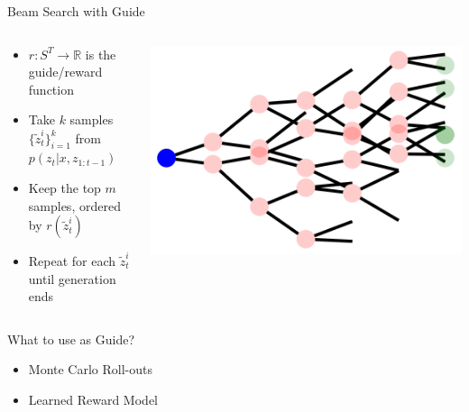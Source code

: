 \documentclass[14pt,aspectratio=169]{beamer}
\begin{document}
\begin{frame}{Beam Search with Guide}
	\begin{columns}
		\begin{column}{0.5\linewidth}
			\begin{itemize}
                \item $r: S^T \rightarrow \mathbb{R}$ is the guide/reward function
				\item Take $k$ samples $\{\tilde{z}^i_{t}\}_{i=1}^k$ from $p(z_{t} | x, z_{1:t-1})$
				\item Keep the top $m$ samples, ordered by $r(\tilde{z}^i_{t})$
				\item Repeat for each $\tilde{z}^i_{t}$ until generation ends
			\end{itemize}
		\end{column}
		\begin{column}{0.5\linewidth}
			\includegraphics[width=\textwidth]{images/beam.png}
		\end{column}
	\end{columns}
\end{frame}


\begin{frame}{What to use as Guide?}
	\begin{itemize}
		\item Monte Carlo Roll-outs
		\item Learned Reward Model
	\end{itemize}
\end{frame}
\end{document}
